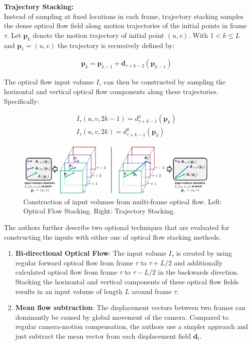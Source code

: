 \textbf{Trajectory Stacking:} \\
Instead of sampling at fixed locations in each frame, trajectory stacking samples the dense optical flow field along motion trajectories of the initial points in frame $\tau$.
Let $\mathbf{p}_k$ denote the motion trajectory of initial point $(u,v)$.
With $1 < k \leq L$ and \mbox{$\mathbf{p}_1 = (u,v)$} the trajectory is recursively defined by:

\begin{align*}
    \mathbf{p}_k = \mathbf{p}_{k-1} + \mathbf{d}_{\tau + k - 2}(\mathbf{p}_{k-1})
\end{align*}

The optical flow input volume $I_\tau$ can then be constructed by sampling the horizontal and vertical optical flow components along these trajectories.
Specifically:

\begin{align*}
    I_\tau(u,v,2k-1) = d_{\tau + k - 1}^x(\mathbf{p}_{k}) \\
    I_\tau(u,v,2k) = d_{\tau + k - 1}^y(\mathbf{p}_{k})
\end{align*}

\begin{figure}[H]
    \centering
    \includegraphics[width=0.9\textwidth]{img_deep/trajectory_stacking}
    \caption{Construction of input volumes from multi-frame optical flow. Left: Optical Flow Stacking. Right: Trajectory Stacking. \cite{simonyan_two-stream_2014}}
    \label{fig:trajectory_stacking}
\end{figure}

The authors further describe two optional techniques that are evaluated for constructing the inputs with either one of optical flow stacking methods.
\begin{enumerate}
    \item \textbf{Bi-directional Optical Flow}: The input volume $I_{\tau}$ is created by using regular forward optical flow from frame $\tau$ to $\tau + L/2$ and additionally calculated optical flow from frame $\tau$ to $\tau - L/2$ in the backwards direction. Stacking the horizontal and vertical components of these optical flow fields results in an input volume of length $L$ around frame $\tau$. 
    \item \textbf{Mean flow subtraction}: The displacement vectors between two frames can dominantly be caused by global movement of the camera. Compared to regular camera-motion compensation, the authors use a simpler approach and just subtract the mean vector from each displacement field $\mathbf{d}_t$.
\end{enumerate}


